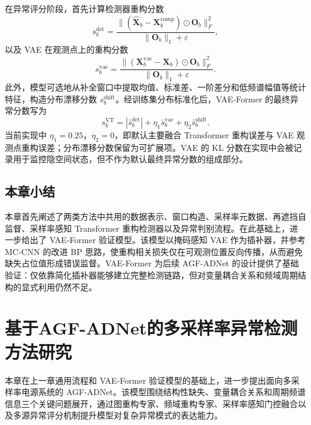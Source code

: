 \documentclass[bachelor, vlined]{DissertUESTC}
\begin{document}
    在异常评分阶段，首先计算检测器重构分数
    \begin{equation}
        s_b^{\mathrm{det}}
        =
        \frac{\|(\hat{\mathbf{X}}_b-\mathbf{X}_b^{\mathrm{comp}})\odot \mathbf{O}_b\|_F^2}{\|\mathbf{O}_b\|_1 + \varepsilon},
    \end{equation}
    以及 VAE 在观测点上的重构分数
    \begin{equation}
        s_b^{\mathrm{vae}}
        =
        \frac{\|(\mathbf{X}_b^{\mathrm{vae}}-\mathbf{X}_b)\odot \mathbf{O}_b\|_F^2}{\|\mathbf{O}_b\|_1 + \varepsilon}.
    \end{equation}
    此外，模型可选地从补全窗口中提取均值、标准差、一阶差分和低频谱幅值等统计特征，构造分布漂移分数 $s_b^{\mathrm{shift}}$。经训练集分布标准化后，VAE-Former 的最终异常分数写为
    \begin{equation}
        s_b^{\mathrm{VT}}
        =
        \left|\bar{s}_b^{\mathrm{det}}\right|
        +
        \eta_1\bar{s}_b^{\mathrm{vae}}
        +
        \eta_2\bar{s}_b^{\mathrm{shift}}.
    \end{equation}
    当前实现中 $\eta_1=0.25$，$\eta_2=0$，即默认主要融合 Transformer 重构误差与 VAE 观测点重构误差；分布漂移分数保留为可扩展项。VAE 的 KL 分数在实现中会被记录用于监控隐空间状态，但不作为默认最终异常分数的组成部分。

    \section{本章小结}

    本章首先阐述了两类方法中共用的数据表示、窗口构造、采样率元数据、再遮挡自监督、采样率感知 Transformer 重构检测器以及异常判别流程。在此基础上，进一步给出了 VAE-Former 验证模型。该模型以掩码感知 VAE 作为插补器，并参考 MC-CNN 的改进 BP 思路，使重构相关损失仅在可观测位置反向传播，从而避免缺失占位值形成错误监督。VAE-Former 为后续 AGF-ADNet 的设计提供了基础验证：仅依靠简化插补器能够建立完整检测链路，但对变量耦合关系和频域周期结构的显式利用仍然不足。

    \chapter{基于AGF-ADNet的多采样率异常检测方法研究}

    本章在上一章通用流程和 VAE-Former 验证模型的基础上，进一步提出面向多采样率电源系统的 AGF-ADNet。该模型围绕结构性缺失、变量耦合关系和周期频谱信息三个关键问题展开，通过图重构专家、频域重构专家、采样率感知门控融合以及多源异常评分机制提升模型对复杂异常模式的表达能力。
\end{document}
